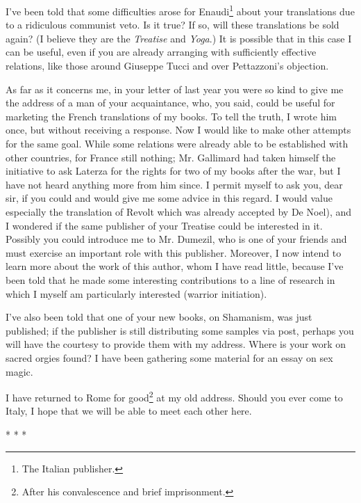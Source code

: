 I've been told that some difficulties arose for Enaudi\footnote{The Italian publisher.} about your translations due to a ridiculous communist veto. Is it true? If so, will these translations be sold again? (I believe they are the \emph{Treatise} and \emph{Yoga}.) It is possible that in this case I can be useful, even if you are already arranging with sufficiently effective relations, like those around Giuseppe Tucci and over Pettazzoni's objection.

As far as it concerns me, in your letter of last year you were so kind to give me the address of a man of your acquaintance, who, you said, could be useful for marketing the French translations of my books. To tell the truth, I wrote him once, but without receiving a response. Now I would like to make other attempts for the same goal. While some relations were already able to be established with other countries, for France still nothing; Mr. Gallimard had taken himself the initiative to ask Laterza for the rights for two of my books after the war, but I have not heard anything more from him since. I permit myself to ask you, dear sir, if you could and would give me some advice in this regard. I would value especially the translation of Revolt which was already accepted by De Noel), and I wondered if the same publisher of your Treatise could be interested in it. Possibly you could introduce me to Mr. Dumezil, who is one of your friends and must exercise an important role with this publisher. Moreover, I now intend to learn more about the work of this author, whom I have read little, because I've been told that he made some interesting contributions to a line of research in which I myself am particularly interested (warrior initiation).

I've also been told that one of your new books, on Shamanism, was just published; if the publisher is still distributing some samples via post, perhaps you will have the courtesy to provide them with my address. Where is your work on sacred orgies found? I have been gathering some material for an essay on sex magic.

I have returned to Rome for good\footnote{After his convalescence and brief imprisonment.} at my old address. Should you ever come to Italy, I hope that we will be able to meet each other here.



\begin{center}* * *\end{center}

